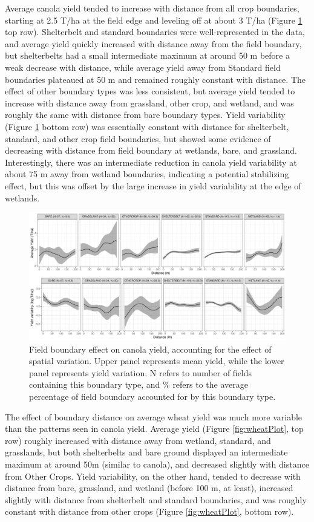 \documentclass[]{elsarticle} %
\begin{document}
Average canola yield tended to increase with distance from all crop boundaries, starting at 2.5 T/ha at the field edge and leveling off at about 3 T/ha (Figure \ref{fig:canolaPlot} top row).
Shelterbelt and standard boundaries were well-represented in the data, and average yield quickly increased with distance away from the field boundary, but shelterbelts had a small intermediate maximum at around 50 m before a weak decrease with distance, while average yield away from Standard field boundaries plateaued at 50 m and remained roughly constant with distance.
The effect of other boundary types was less consistent, but average yield tended to increase with distance away from grassland, other crop, and wetland, and was roughly the same with distance from bare boundary types.
Yield variability (Figure \ref{fig:canolaPlot} bottom row) was essentially constant with distance for shelterbelt, standard, and other crop field boundaries, but showed some evidence of decreasing with distance from field boundary at wetlands, bare, and grassland.
Interestingly, there was an intermediate reduction in canola yield variability at about 75 m away from wetland boundaries, indicating a potential stabilizing effect, but this was offset by the large increase in yield variability at the edge of wetlands.

\begin{figure}
\includegraphics[width=1\linewidth]{../Figures/ModelSummary3a_canola} \caption{Field boundary effect on canola yield, accounting for the effect of spatial variation. Upper panel represents mean yield, while the lower panel represents yield variation. N refers to number of fields containing this boundary type, and \% refers to the average percentage of field boundary accounted for by this boundary type.}\label{fig:canolaPlot}
\end{figure}

The effect of boundary distance on average wheat yield was much more variable than the patterns seen in canola yield.
Average yield (Figure \ref{fig:wheatPlot}, top row) roughly increased with distance away from wetland, standard, and grasslands, but both shelterbelts and bare ground displayed an intermediate maximum at around 50m (similar to canola), and decreased slightly with distance from Other Crops.
Yield variability, on the other hand, tended to decrease with distance from bare, grassland, and wetland (before 100 m, at least), increased slightly with distance from shelterbelt and standard boundaries, and was roughly constant with distance from other crops (Figure \ref{fig:wheatPlot}, bottom row).
\end{document}
